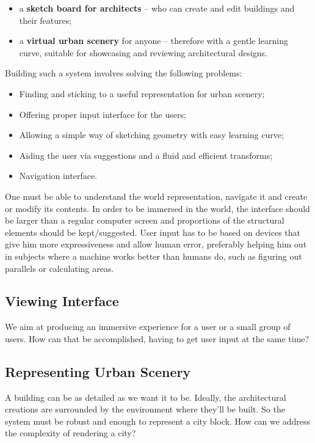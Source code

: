\begin{itemize}
	\item a {\bf sketch board for architects} -- who can create and edit buildings and their features;
	\item a {\bf virtual urban scenery} for anyone -- therefore with a gentle learning curve, suitable for showcasing and reviewing architectural designs.
\end{itemize}

Building such a system involves solving the following problems:
\begin{itemize}
	\item Finding and sticking to a useful representation for urban scenery;
	\item Offering proper input interface for the users;
	\item Allowing a simple way of sketching geometry with easy learning curve;
	\item Aiding the user via suggestions and a fluid and efficient transforms;
	\item Navigation interface.
\end{itemize}


One must be able to understand the world representation, navigate it and create or modify its contents.
In order to be immersed in the world, the interface should be larger than a regular computer screen
and proportions of the structural elements should be kept/suggested.
User input has to be based on devices that give him more expressiveness and allow human error,
preferably helping him out in subjects where a machine works better than humans do,
such as figuring out parallels or calculating areas.


\subsection{Viewing Interface}
We aim at producing an immersive experience for a user or a small group of users.
How can that be accomplished, having to get user input at the same time?


\subsection{Representing Urban Scenery}
A building can be as detailed as we want it to be.
Ideally, the architectural creations are surrounded by the environment
where they'll be built. So the system must be robust and enough to represent a city block.
How can we address the complexity of rendering a city?


